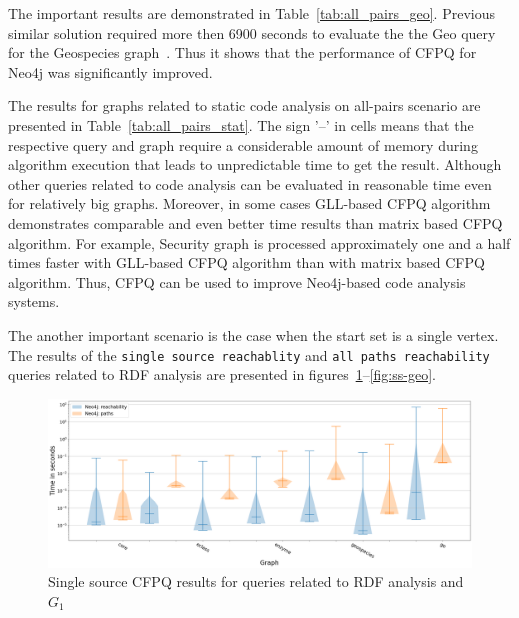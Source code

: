 The important results are demonstrated in Table~\ref{tab:all_pairs_geo}. Previous similar solution required more then 6900 seconds to evaluate the the Geo query for the Geospecies graph~\cite{10.1145/3335783.3335791}. Thus it shows that the performance of CFPQ for Neo4j was significantly improved.


The results for graphs related to static code analysis on all-pairs scenario are presented in Table~\ref{tab:all_pairs_stat}. The sign '--' in cells means that the respective query and graph require a considerable amount of memory during algorithm execution that leads to unpredictable time to get the result.
Although other queries related to code analysis can be evaluated in reasonable time even for relatively big graphs. Moreover, in some cases GLL-based CFPQ algorithm demonstrates comparable and even better time results than matrix based CFPQ algorithm. For example, Security graph is processed approximately one and a half times faster with GLL-based CFPQ algorithm than with matrix based CFPQ algorithm. Thus, CFPQ can be used to improve Neo4j-based code analysis systems. 

The another important scenario is the case when the start set is a single vertex. 
The results of the \texttt{single source reachablity} and \texttt{all paths reachability} queries related to RDF analysis are presented in figures~\ref{fig:ss-g1}--\ref{fig:ss-geo}.

\begin{figure}[h!]
    \centering
    \includegraphics[width=\textwidth]{figures/ss-g1.png}
    \caption{Single source CFPQ results for queries related to RDF analysis and $G_1$}
    \label{fig:ss-g1}
\end{figure}

